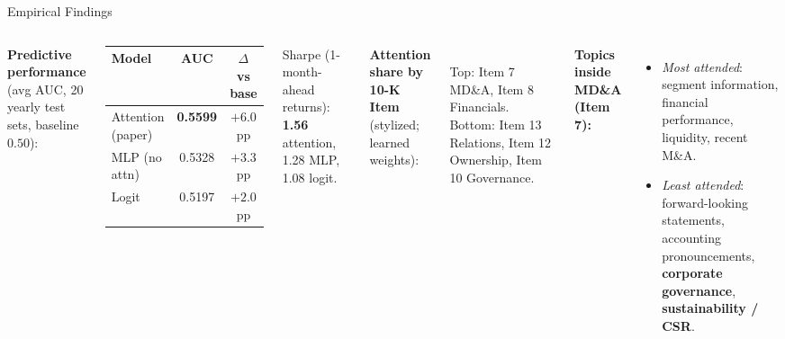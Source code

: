 \begin{frame}{Empirical Findings}
\begin{columns}[T]
\footnotesize
\textbf{Predictive performance} (avg AUC, 20 yearly test sets, baseline $0.50$):
\begin{center}
\begin{tabular}{l c c}
\toprule
Model & AUC & $\Delta$ vs base \\
\midrule
Attention (paper) & \textbf{0.5599} & $+6.0$ pp \\
MLP (no attn)     & 0.5328 & $+3.3$ pp \\
Logit             & 0.5197 & $+2.0$ pp \\
\bottomrule
\end{tabular}
\end{center}

\smallskip
Sharpe (1-month-ahead returns): \textbf{1.56} attention, 1.28 MLP, 1.08 logit.

\medskip
\textbf{Attention share by 10-K Item} (stylized; learned weights):
\begin{center}
\\
{\scriptsize Top: Item 7 MD\&A, Item 8 Financials. Bottom: Item 13 Relations, Item 12 Ownership, Item 10 Governance.}
\end{center}

\footnotesize
\textbf{Topics inside MD\&A (Item 7):}
\begin{itemize}
\item \emph{Most attended}: segment information, financial performance, liquidity, recent M\&A.
\item \emph{Least attended}: forward-looking statements, accounting pronouncements, \textbf{corporate governance}, \textbf{sustainability / CSR}.
\end{itemize}


\end{columns}
\end{frame}
